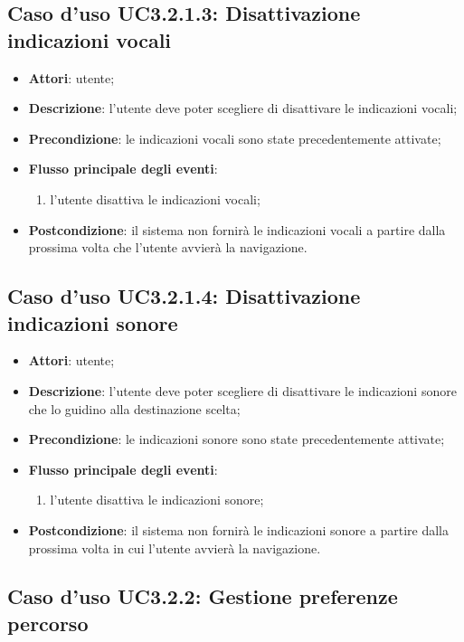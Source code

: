 \documentclass[../AnalisiDeiRequisiti.tex]{subfiles}
\begin{document}
\subsection{Caso d'uso UC3.2.1.3: Disattivazione indicazioni vocali}
\begin{itemize}
\item \textbf{Attori}: utente;
\item \textbf{Descrizione}: l'utente deve poter scegliere di disattivare le indicazioni vocali; 
      \item \textbf{Precondizione}: le indicazioni vocali sono state precedentemente attivate;
      \item \textbf{Flusso principale degli eventi}:
          \begin{enumerate}
          \item l'utente disattiva le indicazioni vocali;
      \end{enumerate}
    \item \textbf{Postcondizione}: il sistema non fornirà le indicazioni vocali a partire dalla prossima volta che l'utente avvierà la navigazione.
  \end{itemize}
\hypertarget{UC3.2.1.4}{}
\subsection{Caso d'uso UC3.2.1.4: Disattivazione indicazioni sonore}
\begin{itemize}
\item \textbf{Attori}: utente;
\item \textbf{Descrizione}: l'utente deve poter scegliere di disattivare le indicazioni sonore che lo guidino alla destinazione scelta; 
      \item \textbf{Precondizione}: le indicazioni sonore sono state precedentemente attivate;
      \item \textbf{Flusso principale degli eventi}:
          \begin{enumerate}
          \item l'utente disattiva le indicazioni sonore;
      \end{enumerate}
    \item \textbf{Postcondizione}: il sistema non fornirà le indicazioni sonore a partire dalla prossima volta in cui l'utente avvierà la navigazione.
  \end{itemize}
\hypertarget{UC3.2.2}{}
\subsection{Caso d'uso UC3.2.2: Gestione preferenze percorso}
\end{document}
